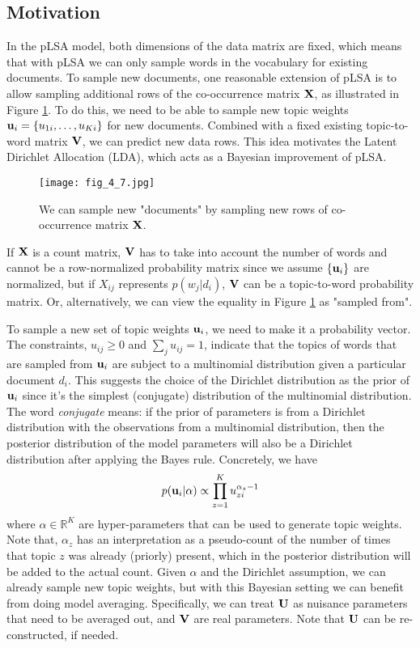\documentclass[../book-template.tex]{subfiles}
\begin{document}
\subsection{Motivation}
In the pLSA model, both dimensions of the data matrix are fixed, which means that with pLSA we can only sample words in the vocabulary for existing documents. To sample new documents, one reasonable extension of pLSA is to allow sampling additional rows of the co-occurrence matrix ${\bf X}$, as illustrated in Figure \ref{fig_4_7}. To do this, we need to be able to sample new topic weights ${\bf u}_i=\{u_{1i},\dots,u_{Ki}\}$ for new documents. Combined with a fixed existing topic-to-word matrix ${\bf V}$, we can predict new data rows. This idea motivates the Latent Dirichlet Allocation (LDA), which acts as a Bayesian improvement of pLSA. 
\begin{figure}[h] 
	\centering 
	\texttt{[image: fig\_4\_7.jpg]} 
	\caption{We can sample new "documents" by sampling new rows of co-occurrence matrix ${\bf X}$.}\label{fig_4_7}
\end{figure}
\begin{remark}
	If ${\bf X}$ is a count matrix, ${\bf V}$ has to take into account the number of words and cannot be a row-normalized probability matrix since we assume $\{{\bf u}_i\}$ are normalized, but if $X_{ij}$ represents $p(w_j|d_i)$, ${\bf V}$ can be a topic-to-word probability matrix. Or, alternatively, we can view the equality in Figure \ref{fig_4_7} as "sampled from".
\end{remark}
\par To sample a new set of topic weights ${\bf u}_i$, we need to make it a probability vector. The constraints, $u_{ij}\geq 0$ and $\sum_j u_{ij}=1$, indicate that the topics of words that are sampled from ${\bf u}_i$ are subject to a multinomial distribution given a particular document $d_i$. This suggests the choice of the Dirichlet distribution as the prior of ${\bf u}_i$ since it's the simplest (conjugate) distribution of the multinomial distribution. The word \emph{conjugate} means: if the prior of parameters is from a Dirichlet distribution with the observations from a multinomial distribution, then the posterior distribution of the model parameters will also be a Dirichlet distribution after applying the Bayes rule. Concretely, we have
\begin{equation*}
	p({\bf u}_i|\alpha)\propto\prod_{z=1}^{K}u_{zi}^{\alpha_z-1}
\end{equation*}
where $\alpha\in \mathbb{R}^K$ are hyper-parameters that can be used to generate topic weights. Note that, 
$\alpha_z$ has an interpretation as a pseudo-count of the number of times that topic $z$ was already (priorly) present, which in the posterior distribution will be added to the actual count. Given $\alpha$ and the Dirichlet assumption, we can already sample new topic weights, but with this Bayesian setting we can benefit from doing model averaging. Specifically, we can treat ${\bf U}$ as nuisance parameters that need to be averaged out, and ${\bf V}$ are real parameters. Note that ${\bf U}$ can be re-constructed, if needed.
\end{document}
